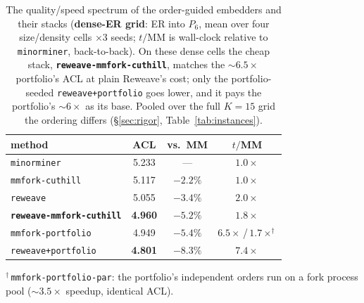 \documentclass[acmsmall,anonymous,nonacm]{acmart}
\begin{document}
\begin{table}[t]
\caption{The quality/speed spectrum of the order-guided embedders and their stacks
(\textbf{dense-ER grid}: ER into $P_6$, mean over four size/density cells
$\times3$ seeds; $t/$MM is
wall-clock relative to \texttt{minorminer}, back-to-back). On these dense cells the
cheap stack,
\textbf{\texttt{reweave-mmfork-cuthill}}, matches the ${\sim}6.5\times$ portfolio's
ACL at plain Reweave's cost; only the portfolio-seeded \texttt{reweave+portfolio}
goes lower, and it pays the portfolio's ${\sim}6\times$ as its base. Pooled over
the full $K{=}15$ grid the ordering differs (\S\ref{sec:rigor},
Table~\ref{tab:instances}).}
\label{tab:stack}
\small
\begin{tabular}{lccc}
\toprule
method & ACL & vs.\ MM & $t/$MM \\
\midrule
\texttt{minorminer}                  & 5.233 & ---      & $1.0\times$ \\
\texttt{mmfork-cuthill}              & 5.117 & $-2.2\%$ & $1.0\times$ \\
\texttt{reweave}                     & 5.055 & $-3.4\%$ & $2.0\times$ \\
\textbf{\texttt{reweave-mmfork-cuthill}} & \textbf{4.960} & $\mathbf{-5.2\%}$ & $\mathbf{1.8\times}$ \\
\texttt{mmfork-portfolio}            & 4.949 & $-5.4\%$ & $6.5\times$\,/\,$1.7\times^{\dagger}$ \\
\texttt{reweave+portfolio}           & \textbf{4.801} & $-8.3\%$ & $7.4\times$ \\
\bottomrule
\end{tabular}

{\footnotesize $^{\dagger}$\,\texttt{mmfork-portfolio-par}: the portfolio's
independent orders run on a fork process pool (${\sim}3.5\times$ speedup,
identical ACL).}
\end{table}
\end{document}
